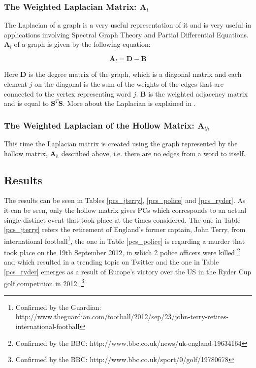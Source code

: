 \documentclass[graybox]{svmult}
\newcommand{\smat}{\mathbf{S}}
\newcommand{\covmat}{\mathbf{A}}
\newcommand{\tp}{^T}
\begin{document}
\subsubsection{The Weighted Laplacian Matrix: $\mathbf{A}_{l}$}

The Laplacian of a graph is a very useful representation of it and is very useful in applications involving Spectral Graph Theory and Partial Differential Equations. $\mathbf{A}_{l}$ of a graph is given by the following equation:

\begin{equation}
\mathbf{A}_{l} = \mathbf{D} - \mathbf{B}
\end{equation}

Here $\mathbf{D}$ is the degree matrix of the graph, which is a diagonal matrix and each element $j$ on the diagonal is the sum of the weights of the edges that are connected to the vertex representing word $j$. $\mathbf{B}$ is the weighted adjacency matrix and is equal to $\smat\tp\smat$. More about the Laplacian is explained in \cite{laplacian_spielman}. 

\subsubsection{The Weighted Laplacian of the Hollow Matrix: $\mathbf{A}_{lh}$}

This time the Laplacian matrix is created using the graph represented by the hollow matrix, $\covmat_h$ described above, i.e. there are no edges from a word to itself.

\subsection{Results}

The results can be seen in Tables \ref{pcs_jterry}, \ref{pcs_police} and \ref{pcs_ryder}. As it can be seen, only the hollow matrix gives PCs which corresponds to an actual single distinct event that took place at the times considered. The one in Table \ref{pcs_jterry} refers the retirement of England's former captain, John Terry, from international football\footnote{Confirmed by the Guardian: http://www.theguardian.com/football/2012/sep/23/john-terry-retires-international-football}, the one in Table \ref{pcs_police} is regarding a murder that took place on the 19th September 2012, in which 2 police officers were killed \footnote{Confirmed by the BBC: http://www.bbc.co.uk/news/uk-england-19634164} and which resulted in a trending topic on Twitter and the one in Table \ref{pcs_ryder} emerges as a result of Europe's victory over the US in the Ryder Cup golf competition in 2012. \footnote{Confirmed by the BBC: http://www.bbc.co.uk/sport/0/golf/19780678}
\end{document}
